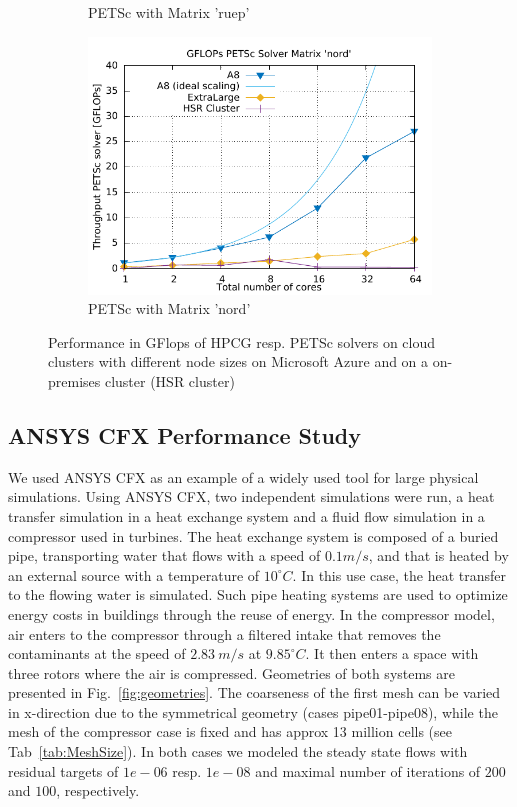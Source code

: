 \documentclass[3p,times]{elsarticle}
\begin{document}
\begin{figure}[h]
\begin{subfigure}{.33\textwidth}
	\caption{PETSc with Matrix 'ruep'}
  \label{fig:ruep}
\end{subfigure}%
\begin{subfigure}{.33\textwidth}
  \centering
  \includegraphics[width=\linewidth]{gplt-gflops-nord}
	\caption{PETSc with Matrix 'nord'}
  \label{fig:nord}
\end{subfigure}

\caption{Performance in GFlops of HPCG resp. PETSc solvers on cloud clusters with different node sizes on Microsoft Azure and on a on-premises cluster (HSR cluster) }
\label{fig:test}
\end{figure}


 

\subsection{ANSYS CFX Performance Study}
We used ANSYS CFX as an example of a widely used tool for large physical simulations.
Using ANSYS CFX, two independent simulations were run, a heat transfer simulation in a heat exchange system and a fluid flow simulation in a compressor used in turbines.
The heat exchange system is composed of a buried pipe, transporting water that flows with a speed of $0.1 m/s$, and that is heated by an external source with a temperature of $10 ^\circ C$. In this use case, the heat transfer to the flowing water is simulated. Such pipe heating systems are used to optimize energy costs in buildings through the reuse of energy.
In the compressor model, air enters to the compressor through a filtered intake that removes the contaminants at the speed of $2.83\ m/s$ at $9.85 ^\circ C$. It then enters a space with three rotors where the air is compressed. Geometries of both systems are presented in Fig.~\ref{fig:geometries}. The coarseness of the first mesh can be varied  in x-direction due to the symmetrical geometry (cases pipe01-pipe08), while the mesh of the compressor case is fixed and has approx 13 million cells (see Tab~\ref{tab:MeshSize}). In both cases we modeled the steady state flows with residual targets of $1e-06$ resp. $1e-08$ and maximal number of iterations of $200$ and $100$, respectively. 
\end{document}
